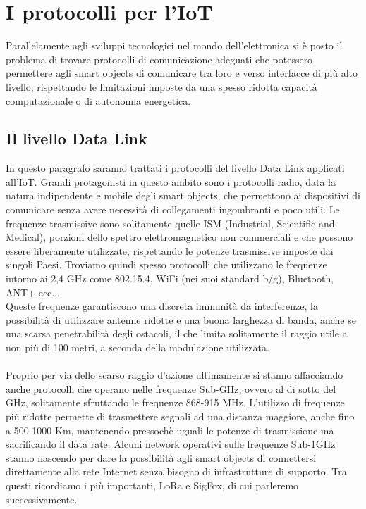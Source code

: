 \chapter{I protocolli per l'IoT}
Parallelamente agli sviluppi tecnologici nel mondo dell'elettronica si è posto il problema di trovare protocolli di comunicazione adeguati che potessero permettere agli smart objects di comunicare tra loro e verso interfacce di più alto livello, rispettando le limitazioni imposte da una spesso ridotta capacità computazionale o di autonomia energetica.


\section{Il livello Data Link}
In questo paragrafo saranno trattati i protocolli del livello Data Link applicati all'IoT. Grandi protagonisti in questo ambito sono i protocolli radio, data la natura indipendente e mobile degli smart objects, che permettono ai dispositivi di comunicare senza avere necessità di collegamenti ingombranti e poco utili. Le frequenze trasmissive sono solitamente quelle ISM (Industrial, Scientific and Medical), porzioni dello spettro elettromagnetico non commerciali e che possono essere liberamente utilizzate, rispettando le potenze trasmissive imposte dai singoli Paesi. Troviamo quindi spesso protocolli che utilizzano le frequenze intorno ai 2,4 GHz come 802.15.4, WiFi (nei suoi standard b/g), Bluetooth, ANT+ ecc...
\\Queste frequenze garantiscono una discreta immunità da interferenze, la possibilità di utilizzare antenne ridotte e una buona larghezza di banda, anche se una scarsa penetrabilità degli ostacoli, il che limita solitamente il raggio utile a non più di 100 metri, a seconda della modulazione utilizzata.
\\\\Proprio per via dello scarso raggio d'azione ultimamente si stanno affacciando anche protocolli che operano nelle frequenze Sub-GHz, ovvero al di sotto del GHz, solitamente sfruttando le frequenze 868-915 MHz. L'utilizzo di frequenze più ridotte permette di trasmettere segnali ad una distanza maggiore, anche fino a 500-1000 Km, mantenendo pressochè uguali le potenze di trasmissione ma sacrificando il data rate. Alcuni network operativi sulle frequenze Sub-1GHz stanno nascendo per dare la possibilità agli smart objects di connettersi direttamente alla rete Internet senza bisogno di infrastrutture di supporto. Tra questi ricordiamo i più importanti, LoRa e SigFox, di cui parleremo successivamente.

